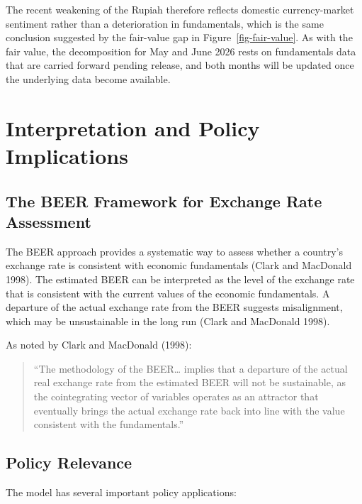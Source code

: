 \documentclass[
  manuscript=article,
  layout=publish,
  year=2026,
  volume=6,
]{den}
\begin{document}
The recent weakening of the Rupiah therefore reflects domestic
currency-market sentiment rather than a deterioration in fundamentals,
which is the same conclusion suggested by the fair-value gap in
Figure~\ref{fig-fair-value}. As with the fair value, the decomposition
for May and June 2026 rests on fundamentals data that are carried
forward pending release, and both months will be updated once the
underlying data become available.

\section{Interpretation and Policy
Implications}\label{interpretation-and-policy-implications}

\subsection{The BEER Framework for Exchange Rate
Assessment}\label{the-beer-framework-for-exchange-rate-assessment}

The BEER approach provides a systematic way to assess whether a
country's exchange rate is consistent with economic fundamentals (Clark
and MacDonald 1998). The estimated BEER can be interpreted as the level
of the exchange rate that is consistent with the current values of the
economic fundamentals. A departure of the actual exchange rate from the
BEER suggests misalignment, which may be unsustainable in the long run
(Clark and MacDonald 1998).

As noted by Clark and MacDonald (1998):

\begin{quote}
``The methodology of the BEER\ldots{} implies that a departure of the
actual real exchange rate from the estimated BEER will not be
sustainable, as the cointegrating vector of variables operates as an
attractor that eventually brings the actual exchange rate back into line
with the value consistent with the fundamentals.''
\end{quote}

\subsection{Policy Relevance}\label{policy-relevance}

The model has several important policy applications:
\end{document}
